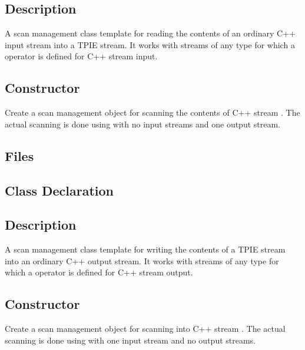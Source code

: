 \subsection{Description}
A scan management class template for reading the contents of an
ordinary C++ input stream into a TPIE stream.  It works with
streams of any type for which a \myverb{>>} operator is defined for C++
stream input.

\subsection{Constructor}
  \btabb
     {Create a
scan management object for scanning the contents of C++ stream
. The actual scanning is done using  with
no input streams and one output stream.}
  \etabb



\subsection{Files}
  \btabb
     {}
  \etabb


\subsection{Class Declaration}
  \btabb
     {}
  \etabb

\subsection{Description}
A scan management class template for writing the contents of a TPIE stream
into an ordinary C++ output stream.  It works with
streams of any type for which a \myverb{<<} operator is defined for C++
stream output.

\subsection{Constructor}
  \btabb
     {Create a
scan management object for scanning into C++ stream
. The actual scanning is done using  with
one input stream and no output streams.}
  \etabb


